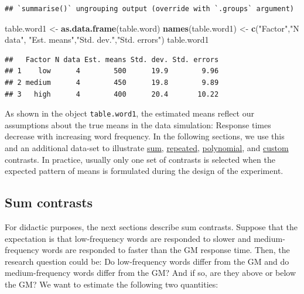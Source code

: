 \documentclass[12pt,]{krantz}
\newenvironment{Shaded}{\begin{snugshade}}{\end{snugshade}}
\newcommand{\KeywordTok}[1]{\textcolor[rgb]{0.13,0.29,0.53}{\textbf{#1}}}
\newcommand{\NormalTok}[1]{#1}
\newcommand{\StringTok}[1]{\textcolor[rgb]{0.31,0.60,0.02}{#1}}
\theoremstyle{definition}
\theoremstyle{definition}
\theoremstyle{definition}
\theoremstyle{remark}
\begin{document}
\begin{verbatim}
## `summarise()` ungrouping output (override with `.groups` argument)
\end{verbatim}

\begin{Shaded}
\begin{Highlighting}[]
\NormalTok{table.word1 <-}\StringTok{ }\KeywordTok{as.data.frame}\NormalTok{(table.word)}
\KeywordTok{names}\NormalTok{(table.word1) <-}\StringTok{ }\KeywordTok{c}\NormalTok{(}\StringTok{"Factor"}\NormalTok{,}\StringTok{"N data"}\NormalTok{,}
                        \StringTok{"Est. means"}\NormalTok{,}\StringTok{"Std. dev."}\NormalTok{,}\StringTok{"Std. errors"}\NormalTok{)}
\NormalTok{table.word1}
\end{Highlighting}
\end{Shaded}

\begin{verbatim}
##   Factor N data Est. means Std. dev. Std. errors
## 1    low      4        500      19.9        9.96
## 2 medium      4        450      19.8        9.89
## 3   high      4        400      20.4       10.22
\end{verbatim}

As shown in the object \texttt{table.word1}, the estimated means reflect our assumptions about the true means in the data simulation: Response times decrease with increasing word frequency.
In the following sections, we use this and an additional data-set to illustrate \protect\hyperlink{sumcontrasts}{sum}, \protect\hyperlink{repeatedcontrasts}{repeated}, \protect\hyperlink{polynomialContrasts}{polynomial}, and \protect\hyperlink{customContrasts}{custom} contrasts. In practice, usually only one set of contrasts is selected when the expected pattern of means is formulated during the design of the experiment.

\hypertarget{sumcontrasts}{%
\subsection{Sum contrasts}\label{sumcontrasts}}

For didactic purposes, the next sections describe sum contrasts. Suppose that the expectation is that low-frequency words are responded to slower and medium-frequency words are responded to faster than the GM response time. Then, the research question could be: Do low-frequency words differ from the GM and do medium-frequency words differ from the GM? And if so, are they above or below the GM? We want to estimate the following two quantities:
\end{document}
